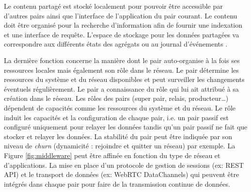 Le contenu partagé est stocké localement pour pouvoir être accessible par 
d'autres 
pairs ainsi que l'interface de l'application du pair courant. Le contenu doit être 
organisé pour la recherche d'information afin de fournir une indexation et une 
interface de requête. 
L'espace de stockage pour les données partagées va correspondre aux différents 
états des agrégats \cite{Desprat2015a,Desprat2015b} ou au journal d'événements 
\cite{Desprat2016,Desprat2017}.


La dernière fonction concerne la manière dont le pair auto-organise à la fois ses 
ressources locales mais également son rôle dans le réseau. Le pair détermine les 
ressources du système et du réseau disponibles et peut surveiller les 
changements éventuels régulièrement.
Le pair a connaissance du rôle qui lui ait attribué à sa création dans le réseau. Les 
rôles des pairs (super pair, relais, producteur\dots) dépendent de 
capacités comme les ressources du système et du réseau. Le rôle induit les 
capacités et la configuration de chaque pair, i.e. un pair passif est configuré 
uniquement pour relayer les données tandis qu'un pair passif ne fait que stocker et 
relayer les données. La stabilité du pair peut être indiquée par son niveau de 
\textit{churn} (dynamicité : rejoindre et quitter un réseau) par exemple. 
La Figure \ref{fig:middleware} peut être affinée en fonction du type de 
réseau et d'applications. La mise en place d'un protocole de gestion de sessions 
(ex: REST API) et le transport de données (ex: WebRTC DataChannels) qui 
peuvent être intégrés dans chaque pair pour faire de la transmission continue de 
données.



